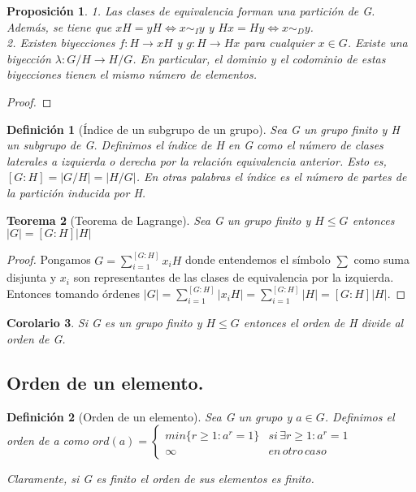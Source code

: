 \documentclass{article}
\theoremstyle{theorem-style}  %
\newtheorem{theorem}{Teorema}[section]  %
\newtheorem{corollary}[theorem]{Corolario} %
\newtheorem{proposition}[theorem]{Proposición}
\theoremstyle{definition-style}
\newtheorem{definition}{Definición}[section]
\theoremstyle{example-style}
\begin{document}
\begin{proposition}
1. Las clases de equivalencia forman una partición de G. Además, se tiene que $xH = yH \iff x \sim_{I} y$ y $Hx = Hy \iff x \sim_{D} y$. \\
2. Existen biyecciones $f:H \rightarrow xH$ y $g:H \rightarrow Hx$ para cualquier $x \in G$. Existe una biyección $\lambda:G/H \rightarrow H/G$. En particular, el dominio y el codominio de estas biyecciones tienen el mismo número de elementos.
\end{proposition}

\begin{proof}

\end{proof}

\begin{definition}[Índice de un subgrupo de un grupo]
Sea G un grupo finito y H un subgrupo de G. Definimos el índice de H en G como el número de clases laterales a izquierda o derecha por la relación equivalencia anterior. Esto es, $[G:H] = |G/H| = |H/G|$. En otras palabras el índice es el número de partes de la partición inducida por H.
\end{definition}

\begin{theorem}[Teorema de Lagrange]
Sea G un grupo finito y $H \le G$ entonces $|G| = [G:H]|H|$
\end{theorem}

\begin{proof}
Pongamos $G = \sum_{i=1}^{[G:H]} x_iH$ donde entendemos el símbolo $\sum$ como suma disjunta y $x_i$ son representantes de las clases de equivalencia por la izquierda. Entonces tomando órdenes $|G| = \sum_{i=1}^{[G:H]} |x_iH| =  \sum_{i=1}^{[G:H]} |H| = [G:H]|H|$.
\end{proof}

\begin{corollary}
Si G es un grupo finito y $H \le G$ entonces el orden de H divide al orden de G. 
\end{corollary}

\subsection{Orden de un elemento.}

\begin{definition}[Orden de un elemento]
Sea G un grupo y $a \in G$. Definimos el orden de a como 
$ord(a) = 
\begin{cases}
min\{r \ge 1:a^r = 1	\} & si \, \exists r \ge 1 : a^r = 1 \\
\infty & en \, otro \, caso
\end{cases}$

Claramente, si G es finito el orden de sus elementos es finito.
\end{definition}
\end{document}
